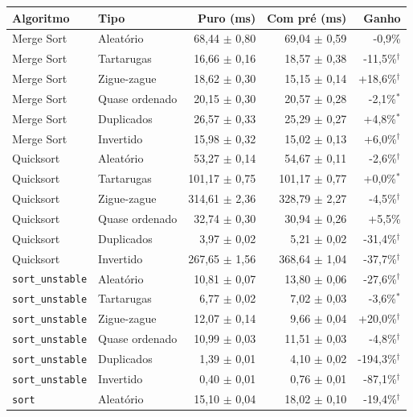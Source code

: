 \footnotesize
\begin{tabular}{llrrr}
\hline
\textbf{Algoritmo} & \textbf{Tipo} & \textbf{Puro (ms)} & \textbf{Com pré (ms)} & \textbf{Ganho} \\
\hline
Merge Sort & Aleatório & 68,44 $\pm$ 0,80 & 69,04 $\pm$ 0,59 & -0,9\% \\
Merge Sort & Tartarugas & 16,66 $\pm$ 0,16 & 18,57 $\pm$ 0,38 & -11,5\%$^{\dagger}$ \\
Merge Sort & Zigue-zague & 18,62 $\pm$ 0,30 & 15,15 $\pm$ 0,14 & +18,6\%$^{\dagger}$ \\
Merge Sort & Quase ordenado & 20,15 $\pm$ 0,30 & 20,57 $\pm$ 0,28 & -2,1\%$^{*}$ \\
Merge Sort & Duplicados & 26,57 $\pm$ 0,33 & 25,29 $\pm$ 0,27 & +4,8\%$^{*}$ \\
Merge Sort & Invertido & 15,98 $\pm$ 0,32 & 15,02 $\pm$ 0,13 & +6,0\%$^{\dagger}$ \\
Quicksort & Aleatório & 53,27 $\pm$ 0,14 & 54,67 $\pm$ 0,11 & -2,6\%$^{\dagger}$ \\
Quicksort & Tartarugas & 101,17 $\pm$ 0,75 & 101,17 $\pm$ 0,77 & +0,0\%$^{*}$ \\
Quicksort & Zigue-zague & 314,61 $\pm$ 2,36 & 328,79 $\pm$ 2,27 & -4,5\%$^{\dagger}$ \\
Quicksort & Quase ordenado & 32,74 $\pm$ 0,30 & 30,94 $\pm$ 0,26 & +5,5\% \\
Quicksort & Duplicados & 3,97 $\pm$ 0,02 & 5,21 $\pm$ 0,02 & -31,4\%$^{\dagger}$ \\
Quicksort & Invertido & 267,65 $\pm$ 1,56 & 368,64 $\pm$ 1,04 & -37,7\%$^{\dagger}$ \\
\texttt{sort\_unstable} & Aleatório & 10,81 $\pm$ 0,07 & 13,80 $\pm$ 0,06 & -27,6\%$^{\dagger}$ \\
\texttt{sort\_unstable} & Tartarugas & 6,77 $\pm$ 0,02 & 7,02 $\pm$ 0,03 & -3,6\%$^{*}$ \\
\texttt{sort\_unstable} & Zigue-zague & 12,07 $\pm$ 0,14 & 9,66 $\pm$ 0,04 & +20,0\%$^{\dagger}$ \\
\texttt{sort\_unstable} & Quase ordenado & 10,99 $\pm$ 0,03 & 11,51 $\pm$ 0,03 & -4,8\%$^{\dagger}$ \\
\texttt{sort\_unstable} & Duplicados & 1,39 $\pm$ 0,01 & 4,10 $\pm$ 0,02 & -194,3\%$^{\dagger}$ \\
\texttt{sort\_unstable} & Invertido & 0,40 $\pm$ 0,01 & 0,76 $\pm$ 0,01 & -87,1\%$^{\dagger}$ \\
\texttt{sort} & Aleatório & 15,10 $\pm$ 0,04 & 18,02 $\pm$ 0,10 & -19,4\%$^{\dagger}$ \\

\end{tabular}
